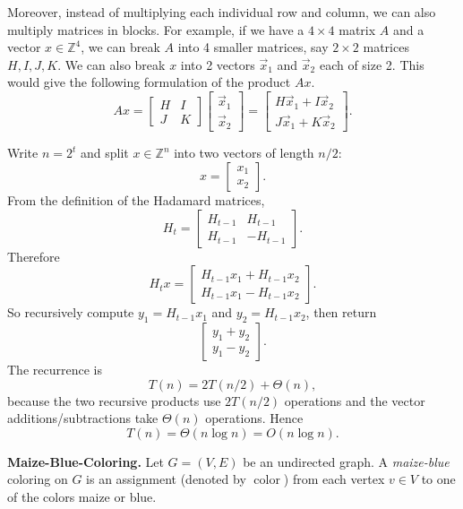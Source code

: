 \documentclass[11pt,addpoints,answers]{exam}
\theoremstyle{plain}            %
\theoremstyle{definition}       %
\theoremstyle{remark}           %
\DeclareMathOperator{\col}{color}
\begin{document}
\begin{questions}
   Moreover, instead of multiplying each individual row and column, we can also multiply matrices in blocks. For example, if we have a $4\times 4$ matrix $A$ and a vector $x\in \mathbb{Z}^4$, we can break $A$ into 4 smaller matrices, say $2\times2$ matrices $H, I, J, K$. We can also break $x$ into 2 vectors $\vec{x}_1$ and $\vec{x}_2$ each of size 2. This would give the following formulation of the product $Ax$.
    \begin{equation*}
       A x = 
       \begin{bmatrix}
       H & I \\
       J & K
       \end{bmatrix}
       \begin{bmatrix}
       \vec{x}_1 \\
       \vec{x}_2
       \end{bmatrix}
       = 
       \begin{bmatrix}
       H\vec{x}_1 + I\vec{x}_2 \\
       J\vec{x}_1 + K\vec{x}_2
       \end{bmatrix}.
   \end{equation*}

\begin{solution}
Write \(n=2^t\) and split \(x\in\mathbb Z^n\) into two vectors of length \(n/2\):
\[
x=\begin{bmatrix}x_1\\x_2\end{bmatrix}.
\]
From the definition of the Hadamard matrices,
\[
H_t=
\begin{bmatrix}
H_{t-1}&H_{t-1}\\
H_{t-1}&-H_{t-1}
\end{bmatrix}.
\]
Therefore
\[
H_tx=
\begin{bmatrix}
H_{t-1}x_1+H_{t-1}x_2\\
H_{t-1}x_1-H_{t-1}x_2
\end{bmatrix}.
\]
So recursively compute \(y_1=H_{t-1}x_1\) and \(y_2=H_{t-1}x_2\), then return
\[
\begin{bmatrix}
y_1+y_2\\
y_1-y_2
\end{bmatrix}.
\]
The recurrence is
\[
T(n)=2T(n/2)+\Theta(n),
\]
because the two recursive products use \(2T(n/2)\) operations and the vector additions/subtractions take \(\Theta(n)\) operations. Hence
\[
T(n)=\Theta(n\log n)=O(n\log n).
\]
\end{solution}


   \question[20] \textbf{Maize-Blue-Coloring.} Let $G = (V,E)$ be an undirected graph. A \emph{maize-blue} coloring on $G$ is an assignment (denoted by $\col$) from each vertex $v \in V$ to one of the colors maize or blue.
    

\end{questions}
\end{document}
